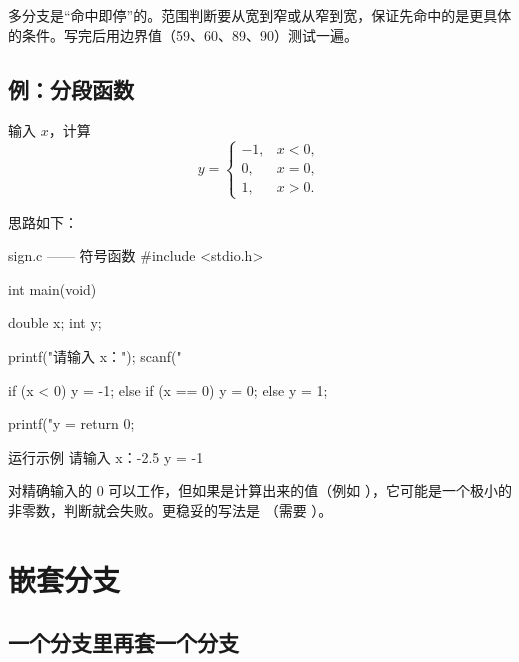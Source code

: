 \begin{pitfall}
多分支是“命中即停”的。范围判断要从宽到窄或从窄到宽，保证先命中的是更具体的条件。写完后用边界值（59、60、89、90）测试一遍。
\end{pitfall}

\subsection{例：分段函数}

\begin{example}
输入 $x$，计算
\[
y = \begin{cases}
-1, & x < 0,\\
0, & x = 0,\\
1, & x > 0.
\end{cases}
\]
\end{example}
\begin{solution}
思路如下：

\begin{codebox}{sign.c —— 符号函数}
#include <stdio.h>

int main(void)
{
    double x;
    int y;

    printf("请输入 x：");
    scanf("%

    if (x < 0) {
        y = -1;
    } else if (x == 0) {
        y = 0;
    } else {
        y = 1;
    }

    printf("y = %
    return 0;
}
\end{codebox}

\begin{outbox}{运行示例}
请输入 x：-2.5
y = -1
\end{outbox}

\begin{pitfall}[浮点数不要直接用 \texttt{==} 判断]
 对精确输入的 0 可以工作，但如果是计算出来的值（例如 ），它可能是一个极小的非零数，判断就会失败。更稳妥的写法是 （需要 ）。
\end{pitfall}
\end{solution}

\section{嵌套分支}

\subsection{一个分支里再套一个分支}

